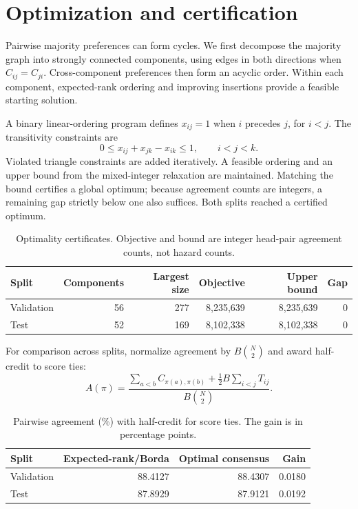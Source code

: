 \documentclass[10pt,a4paper]{article}
\begin{document}
\section{Optimization and certification}
Pairwise majority preferences can form cycles. We first decompose the majority
graph into strongly connected components, using edges in both directions when
$C_{ij}=C_{ji}$. Cross-component preferences then form an acyclic order. Within
each component, expected-rank ordering and improving insertions provide a
feasible starting solution.

A binary linear-ordering program defines $x_{ij}=1$ when $i$ precedes $j$, for
$i<j$. The transitivity constraints are
\begin{equation}
0\leq x_{ij}+x_{jk}-x_{ik}\leq1,\qquad i<j<k.
\end{equation}
Violated triangle constraints are added iteratively. A feasible ordering and an
upper bound from the mixed-integer relaxation are maintained. Matching the bound
certifies a global optimum; because agreement counts are integers, a remaining
gap strictly below one also suffices. Both splits reached a certified optimum.
\begin{table}[H]
\centering
\caption{Optimality certificates. Objective and bound are integer head-pair agreement counts, not hazard counts.}
\label{tab:certificate}
\small
\begin{tabular}{lrrrrr}
\toprule
Split & Components & Largest size & Objective & Upper bound & Gap \\
\midrule
Validation & 56 & 277 & 8,235,639 & 8,235,639 & 0 \\
Test & 52 & 169 & 8,102,338 & 8,102,338 & 0 \\
\bottomrule
\end{tabular}
\end{table}

For comparison across splits, normalize agreement by $B\binom{N}{2}$ and award
half-credit to score ties:
\begin{equation}
A(\pi)=\frac{\sum_{a<b}C_{\pi(a),\pi(b)}+\tfrac12 B\sum_{i<j}T_{ij}}
{B\binom{N}{2}}.
\end{equation}
\begin{table}[H]
\centering
\caption{Pairwise agreement (\%) with half-credit for score ties. The gain is in percentage points.}
\label{tab:agreement}
\small
\begin{tabular}{lrrr}
\toprule
Split & Expected-rank/Borda & Optimal consensus & Gain \\
\midrule
Validation & 88.4127 & 88.4307 & 0.0180 \\
Test & 87.8929 & 87.9121 & 0.0192 \\
\bottomrule
\end{tabular}
\end{table}
\end{document}
